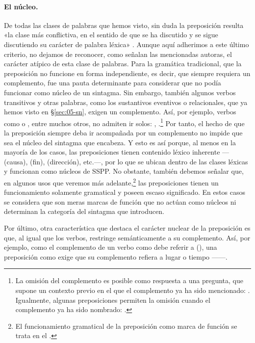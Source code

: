 \paragraph{El núcleo.} De todas las clases de palabras que hemos visto, sin duda
la preposición resulta «la clase más conflictiva, en el sentido de que se ha
discutido y se sigue discutiendo su carácter de palabra léxica»
\parencite[56]{giammatteo2009}. Aunque aquí adherimos a este último criterio, no
dejamos de reconocer, como señalan las mencionadas autoras, el carácter atípico
de esta clase de palabras. Para la gramática tradicional, que la preposición no
funcione en forma independiente, es decir, que siempre requiera un complemento,
fue una pauta determinante para considerar que no podía funcionar como núcleo de
un sintagma. Sin embargo, también algunos verbos transitivos y otras palabras,
como los sustantivos eventivos o relacionales, que ya hemos visto en
§\ref{sec:05-sn}, exigen un complemento. Así, por ejemplo, verbos como
 o , entre muchos otros, no admiten ir solos:
, .\footnote{La
omisión del complemento es posible como respuesta a una pregunta, que supone un
contexto previo en el que el complemento ya ha sido mencionado: . Igualmente, algunas preposiciones
permiten la omisión cuando el complemento ya ha sido nombrado: .} Por tanto, el hecho de que la preposición siempre
deba ir acompañada por un complemento no impide que sea el núcleo del sintagma
que encabeza. Y esto es así porque, al menos en la mayoría de los casos, las
preposiciones tienen contenido léxico inherente --- (causa),
 (fin),  (dirección), etc.---, por lo que se ubican
dentro de las clases léxicas y funcionan como núcleos de SSPP. No obstante,
también debemos señalar que, en algunos usos que veremos más
adelante,\footnote{El funcionamiento gramatical de la preposición como marca de
función se trata en el .} las preposiciones tienen un funcionamiento
solamente gramatical y poseen escaso significado. En estos casos se considera
que son meras marcas de función que no actúan como núcleos ni determinan la
categoría del sintagma que introducen.

Por último, otra característica que destaca el carácter nuclear de la
preposición es que, al igual que los verbos, restringe semánticamente a su
complemento. Así, por ejemplo, como el complemento de un verbo como
 debe referir a  (), una preposición como  exige que su complemento refiera
a lugar o tiempo ------.

